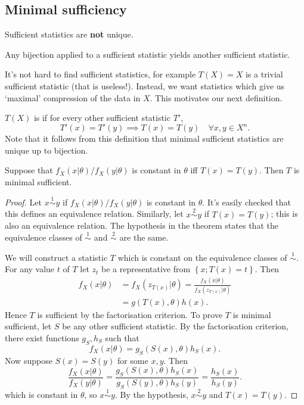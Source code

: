 \documentclass[egregdoesnotlikesansseriftitles,a4paper]{scrartcl}
\begin{document}
\subsection{Minimal sufficiency}
Sufficient statistics are \textbf{not} unique. 
\begin{remark}
      Any bijection applied to a sufficient statistic yields another sufficient statistic.
\end{remark}
It's not hard to find sufficient statistics, for example $T (X)=X$ is a trivial sufficient statistic (that is useless!). Instead, we want statistics which give us `maximal' compression of the data in $X$. This motivates our next definition.
\begin{definition*}
      $T (X)$ is  if for every other sufficient statistic $T'$, \[
      T' (x)=T' (y) \implies T \left(x\right)=T \left(y\right) \quad \forall x,y \in X^{n}
      .\] Note that it follows from this definition that minimal sufficient statistics are unique up to bijection.
\end{definition*}
\begin{theorem}
      Suppose that $f_{X}(x| \theta)/f_{X}(y| \theta)$ is constant in $\theta$ iff $T (x)= T (y)$. Then $T$ is minimal sufficient.
\end{theorem}
\begin{proof}
      Let $x \overset{1}{\sim}  y$ if $f_{X}(x| \theta)/f_{X}(y| \theta)$ is constant in $\theta$. It's easily checked that this defines an equivalence relation. Similarly, let $x \overset{2}{\sim} y$ if $T (x)=T (y)$; this is also an equivalence relation. The hypothesis in the theorem states that the equivalence classes of $\overset{1}{\sim} $ and $\overset{2}{\sim} $ are the same. 
      
      We will construct a statistic $T$ which is constant on the equivalence classes of $\overset{1}{\sim} $. For any value $t$ of $T$ let $z_{t}$ be a representative from $\left\{x; T (x)=t\right\}$. Then
      \begin{align*}
           f_{X}(x| \theta)&=f_{X}(z_{T (x)}|\theta)= \frac{f_{X}(x|\theta)}{f_{X}(z_{T (x)}| \theta)}\\
           &=g (T (x), \theta) h (x).
      \end{align*}
      Hence $T$ is sufficient by the factorisation criterion. To prove $T$ is minimal sufficient, let $S$ be any other sufficient statistic. By the factorisation criterion, there exist functions $g_{S}, h_{S}$ such that \[
      f_{X}(x| \theta)=g_{S}(S (x),\theta)h_{S}(x)
      .\] Now suppose $S (x)=S (y)$ for some $x,y$. Then \[
          \frac{f_{X}(x|\theta)}{f_{X}(y| \theta)}= \frac{g_{S}(S (x),\theta)h_{S}(x)}{g_{S}(S (y),\theta)h_{S}(y)}= \frac{h_{S}(x)}{h_{S}(y)}
      .\] which is constant in $\theta$, so $x \overset{1}{\sim} y$. By the hypothesis, $x \overset{2}{\sim} y$ and $T (x)=T (y)$. 
\end{proof}
\end{document}
